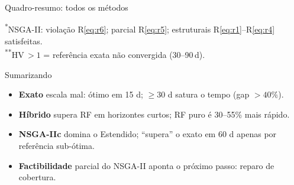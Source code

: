 \begin{frame}{Quadro-resumo: todos os métodos}
    \begin{center}
        \scriptsize
    \end{center}
    \vspace{0.3em}
    {\scriptsize \textsuperscript{*}NSGA-II: violação R\ref{eq:r6}; parcial R\ref{eq:r5};  estruturais R\ref{eq:r1}--R\ref{eq:r4} satisfeitas.} 
    \\ 
    {\scriptsize \textsuperscript{**}HV\,\(>1\) = referência exata não convergida (30--90\,d).}
\end{frame}

\begin{frame}{Sumarizando}
    \begin{itemize}
        \item[\textbf{1.}] \textbf{Exato} escala mal: ótimo em 15 d; \(\geq\)30 d satura o tempo (gap \(>40\%\)).
        \item[\textbf{2.}] \textbf{Híbrido} supera RF em horizontes curtos; RF puro é 30--55\% mais rápido.
        \item[\textbf{3.}] \textbf{NSGA-IIc} domina o Estendido; ``supera'' o exato em 60 d apenas por referência sub-ótima.
        \item[\textbf{4.}] \textbf{Factibilidade} parcial do NSGA-II aponta o próximo passo: reparo de cobertura.
    \end{itemize}
\end{frame}
